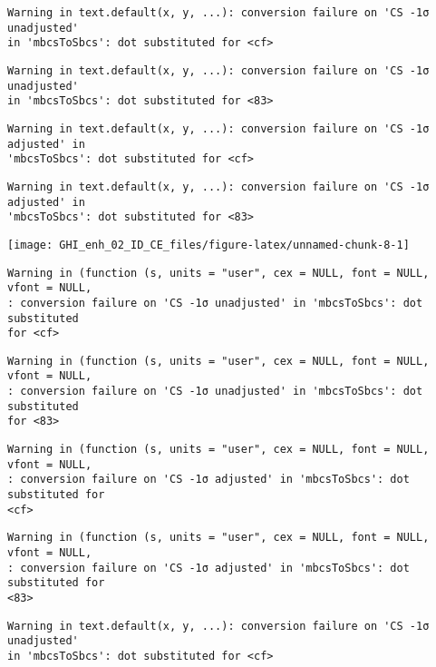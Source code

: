\documentclass[
  10pt,
  a4paper,oneside]{article}
\begin{document}
\begin{verbatim}
Warning in text.default(x, y, ...): conversion failure on 'CS -1σ unadjusted'
in 'mbcsToSbcs': dot substituted for <cf>
\end{verbatim}

\begin{verbatim}
Warning in text.default(x, y, ...): conversion failure on 'CS -1σ unadjusted'
in 'mbcsToSbcs': dot substituted for <83>
\end{verbatim}

\begin{verbatim}
Warning in text.default(x, y, ...): conversion failure on 'CS -1σ adjusted' in
'mbcsToSbcs': dot substituted for <cf>
\end{verbatim}

\begin{verbatim}
Warning in text.default(x, y, ...): conversion failure on 'CS -1σ adjusted' in
'mbcsToSbcs': dot substituted for <83>
\end{verbatim}

\begin{center}\texttt{[image: GHI\_enh\_02\_ID\_CE\_files/figure-latex/unnamed-chunk-8-1]} \end{center}

\begin{verbatim}
Warning in (function (s, units = "user", cex = NULL, font = NULL, vfont = NULL,
: conversion failure on 'CS -1σ unadjusted' in 'mbcsToSbcs': dot substituted
for <cf>
\end{verbatim}

\begin{verbatim}
Warning in (function (s, units = "user", cex = NULL, font = NULL, vfont = NULL,
: conversion failure on 'CS -1σ unadjusted' in 'mbcsToSbcs': dot substituted
for <83>
\end{verbatim}

\begin{verbatim}
Warning in (function (s, units = "user", cex = NULL, font = NULL, vfont = NULL,
: conversion failure on 'CS -1σ adjusted' in 'mbcsToSbcs': dot substituted for
<cf>
\end{verbatim}

\begin{verbatim}
Warning in (function (s, units = "user", cex = NULL, font = NULL, vfont = NULL,
: conversion failure on 'CS -1σ adjusted' in 'mbcsToSbcs': dot substituted for
<83>
\end{verbatim}

\begin{verbatim}
Warning in text.default(x, y, ...): conversion failure on 'CS -1σ unadjusted'
in 'mbcsToSbcs': dot substituted for <cf>
\end{verbatim}
\end{document}
